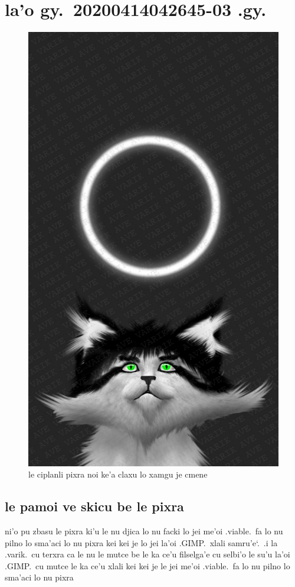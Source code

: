 \documentclass{report}
\newcommand\sds{\spacefactor\sfcode`.\ \space}
\begin{document}
\chapter{la'o gy.\ 20200414042645-03 .gy.}
\begin{figure}[ht]
	\centering
	\includegraphics[keepaspectratio, width=\textwidth, height=0.75\textheight]{20200414042645-03/20200414042645-03.jpg}
	\caption[center]{le ciplanli pixra noi ke'a claxu lo xamgu je cmene}
\end{figure}
\section{le pamoi ve skicu be le pixra}
ni'o pu zbasu le pixra ki'u le nu djica lo nu facki lo jei me'oi .viable.\ fa lo nu pilno lo sma'aci lo nu pixra kei kei je lo jei la'oi .GIMP.\ xlali samru'e\sds  .i la .varik.\ cu terxra ca le nu le mutce be le ka ce'u filselga'e cu selbi'o le su'u la'oi .GIMP.\ cu mutce le ka ce'u xlali kei kei je le jei me'oi .viable.\ fa lo nu pilno lo sma'aci lo nu pixra
\end{document}
